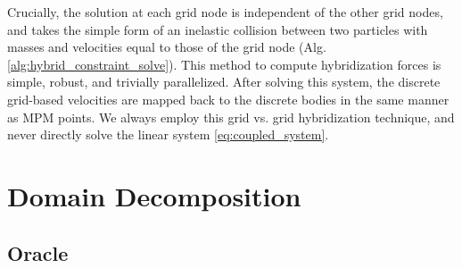 Crucially, the solution at each grid
node is independent of the other grid nodes, and takes the simple form of an inelastic collision between two particles
with masses and velocities equal to those of the grid node (Alg. \ref{alg:hybrid_constraint_solve}). This method to compute hybridization forces is simple, robust, and
trivially parallelized. After solving this system, the discrete grid-based velocities are mapped back to the discrete
bodies in the same manner as MPM points. We always employ this grid vs. grid hybridization technique, and never directly solve the linear system \eqref{eq:coupled_system}.

\section{Domain Decomposition}

\subsection{Oracle}

